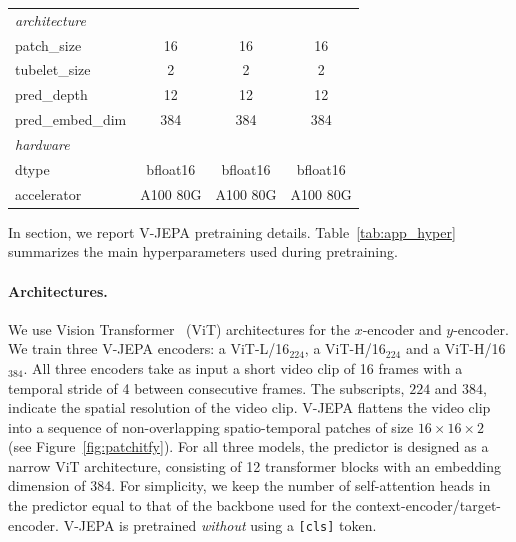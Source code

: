 \documentclass[twocolumn]{fairmeta}
\newcommand{\putalg}{{\small V-JEPA}\xspace}
\theoremstyle{plain}
\theoremstyle{definition}
\theoremstyle{remark}
\begin{document}
\begin{table}
{\begin{tabular}{@{} l c c c @{}}
        
        \midrule \textit{architecture} \\ patch\_size & 16 & 16 & 16
        \\ tubelet\_size & 2 & 2 & 2 \\ pred\_depth & 12 & 12 & 12
        \\ pred\_embed\_dim & 384 & 384 & 384 \\
        
        \midrule \textit{hardware} \\ dtype & bfloat16 & bfloat16 & bfloat16
        \\ accelerator & A100 80G & A100 80G & A100 80G \\
        \bottomrule
    \end{tabular}}
\end{table}


In section, we report \putalg pretraining details. Table~\ref{tab:app_hyper} summarizes the main hyperparameters used during pretraining.


\paragraph{Architectures.}
We use Vision Transformer~\citep{dosovitskiy2020image} (ViT) architectures for the $x$-encoder and $y$-encoder.
We train three \putalg encoders: a ViT-L/16$_{224}$, a ViT-H/16$_{224}$ and a ViT-H/16$_{384}$. All three encoders take as input a short video clip of 16 frames with a temporal stride of 4 between consecutive frames. 
The subscripts, $224$ and $384$, indicate the spatial resolution of the video clip.
\putalg flattens the video clip into a sequence of non-overlapping spatio-temporal patches of size $16 \times 16\times 2$ (see Figure~\ref{fig:patchitfy}).
For all three models, the predictor is designed as a narrow ViT architecture, consisting of 12 transformer blocks with an embedding dimension of 384.
For simplicity, we keep the number of self-attention heads in the predictor equal to that of the backbone used for the context-encoder/target-encoder.
\putalg is pretrained \emph{without} using a {\tt [cls]} token.
\end{document}
